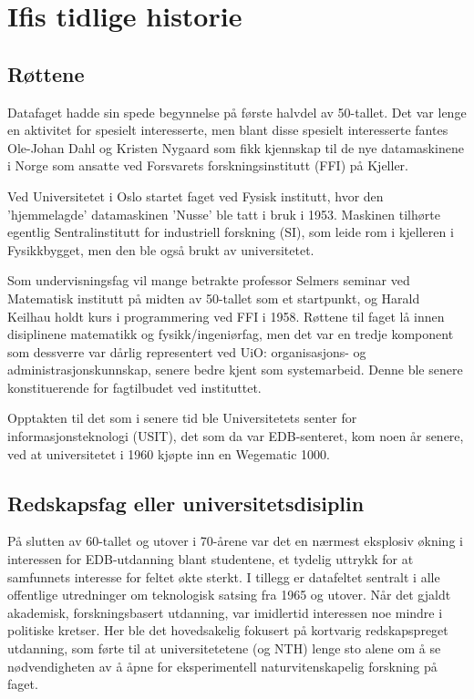 \chapter{Ifis tidlige historie}

\author{Skrevet av Narve Trædal}

\section{Røttene}

Datafaget hadde sin spede begynnelse på første halvdel av 50-tallet. Det var lenge en  aktivitet for spesielt interesserte, men blant disse spesielt interesserte fantes Ole-Johan Dahl og Kristen Nygaard som fikk kjennskap til de nye datamaskinene i Norge som ansatte ved Forsvarets forskningsinstitutt (FFI) på Kjeller. 

Ved Universitetet i Oslo startet faget ved Fysisk institutt, hvor den 'hjemmelagde' datamaskinen 'Nusse' ble tatt i bruk i 1953. Maskinen tilhørte egentlig Sentralinstitutt for industriell forskning (SI), som leide rom i kjelleren i Fysikkbygget, men den ble også brukt av universitetet. 

Som undervisningsfag vil mange betrakte professor Selmers seminar ved Matematisk institutt på midten av 50-tallet som et startpunkt, og Harald Keilhau holdt kurs i programmering ved FFI i 1958. Røttene til faget lå innen disiplinene matematikk og fysikk/ingeniørfag, men det var en tredje komponent som dessverre var dårlig representert ved UiO: organisasjons- og administrasjonskunnskap, senere bedre kjent som systemarbeid. Denne ble senere konstituerende for fagtilbudet ved instituttet. 

Opptakten til det som i senere tid ble Universitetets senter for informasjonsteknologi (USIT), det som da var EDB-senteret, kom noen år senere, ved at universitetet i 1960 kjøpte inn en Wegematic 1000.

\section{Redskapsfag eller universitetsdisiplin}

På slutten av 60-tallet og utover i 70-årene var det en nærmest eksplosiv økning i interessen for EDB-utdanning blant studentene, et tydelig uttrykk for at samfunnets interesse for feltet økte sterkt. I tillegg er datafeltet sentralt i alle offentlige utredninger om teknologisk satsing fra 1965 og utover. Når det gjaldt akademisk, forskningsbasert utdanning, var imidlertid interessen noe mindre i politiske kretser. Her ble det hovedsakelig fokusert på kortvarig redskapspreget utdanning, som førte til at universitetetene (og NTH) lenge sto alene om å se nødvendigheten av å åpne for eksperimentell naturvitenskapelig forskning på faget.

